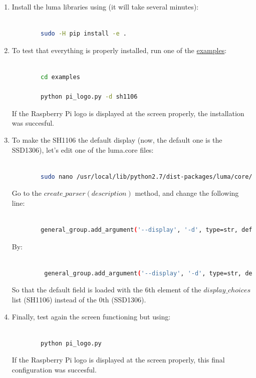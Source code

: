 \documentclass[12pt,a4paper,oneside]{article} %
\begin{document}
\begin{enumerate}
\begin{lstlisting}[language=sh]
		cd
		
		git clone https://github.com/rm-hull/luma.examples.git
	\end{lstlisting}
	\item Install the luma libraries using (it will take several minutes):
	\begin{lstlisting}[language=sh]
	
		sudo -H pip install -e .
	\end{lstlisting}
	\item To test that everything is properly installed, run one of the \href{https://github.com/rm-hull/luma.examples}{examples}:
	\begin{lstlisting}[language=sh]
	
		cd examples
		
		python pi_logo.py -d sh1106
	\end{lstlisting}
	
	If the Raspberry Pi logo is displayed at the screen properly, the installation was succesful.
	\item To make the SH1106 the default display (now, the default one is the SSD1306), let's edit one of the luma.core files:
	\begin{lstlisting}[language=sh]
	
		sudo nano /usr/local/lib/python2.7/dist-packages/luma/core/cmdline.py
	\end{lstlisting}
	
	Go to the $create\_parser(description)$ method, and change the following line:
	\begin{lstlisting}[language=sh,style = textstyle]
	
		general_group.add_argument('--display', '-d', type=str, default=display_choices[0], help='Display type, supports real devices or emulators. Allowed values are: {0}'.format(', '.join(display_choices)), choices=display_choices, metavar='')
	\end{lstlisting}
	
	By:
	\begin{lstlisting}[language=sh,style = textstyle]
	
		 general_group.add_argument('--display', '-d', type=str, default=display_choices[6], help='Display type, supports real devices or emulators. Allowed values are: {0}'.format(', '.join(display_choices)), choices=display_choices, metavar='')
	\end{lstlisting}
	
	 So that the default field is loaded with the 6th element of the $display\_choices$ list (SH1106) instead of the 0th (SSD1306).
	 \item Finally, test again the screen functioning but using:
	 \begin{lstlisting}[language=sh]
	
		python pi_logo.py
	\end{lstlisting}
	
	If the Raspberry Pi logo is displayed at the screen properly, this final configuration was succesful.
\end{enumerate}
\end{document}
